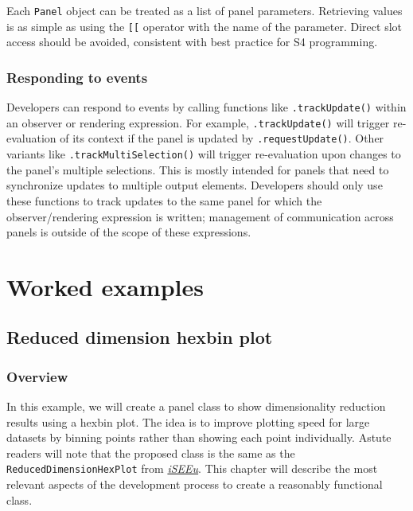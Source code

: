 \documentclass[
]{book}
\begin{document}
Each \texttt{Panel} object can be treated as a list of panel parameters.
Retrieving values is as simple as using the \texttt{{[}{[}} operator with the name of the parameter.
Direct slot access should be avoided, consistent with best practice for S4 programming.

\hypertarget{responding-to-events}{%
\section{Responding to events}\label{responding-to-events}}

Developers can respond to events by calling functions like \texttt{.trackUpdate()} within an observer or rendering expression.
For example, \texttt{.trackUpdate()} will trigger re-evaluation of its context if the panel is updated by \texttt{.requestUpdate()}.
Other variants like \texttt{.trackMultiSelection()} will trigger re-evaluation upon changes to the panel's multiple selections.
This is mostly intended for panels that need to synchronize updates to multiple output elements.
Developers should only use these functions to track updates to the same panel for which the observer/rendering expression is written; management of communication across panels is outside of the scope of these expressions.

\hypertarget{part-worked-examples}{%
\part{Worked examples}\label{part-worked-examples}}

\hypertarget{developing}{%
\chapter{Reduced dimension hexbin plot}\label{developing}}

\hypertarget{overview}{%
\section{Overview}\label{overview}}

In this example, we will create a panel class to show dimensionality reduction results using a hexbin plot.
The idea is to improve plotting speed for large datasets by binning points rather than showing each point individually.
Astute readers will note that the proposed class is the same as the \texttt{ReducedDimensionHexPlot} from \emph{\href{https://bioconductor.org/packages/3.11/iSEEu}{iSEEu}}.
This chapter will describe the most relevant aspects of the development process to create a reasonably functional class.
\end{document}
